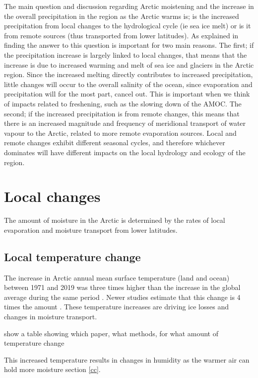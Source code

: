 \documentclass[11pt, oneside]{article}
\begin{document}
The main question and discussion regarding Arctic moistening and the increase in the overall precipitation in the region as the Arctic warms is; is the increased precipitation from local changes to the hydrological cycle (ie sea ice melt) or is it from remote sources (thus transported from lower latitudes). As explained in \cite{bintanja2014future} finding the answer to this question is important for two main reasons. The first; if the precipitation increase is largely linked to local changes, that means that the increase is due to increased warming and melt of sea ice and glaciers in the Arctic region. Since the increased melting directly contributes to increased precipitation, little changes will occur to the overall salinity of the ocean, since evaporation and precipitation will for the most part, cancel out. This is important when we think of impacts related to freshening, such as the slowing down of the AMOC. The second; if the increased precipitation is from remote changes, this means that there is an increased magnitude and frequency of meridional transport of water vapour to the Arctic, related to more remote evaporation sources. Local and remote changes exhibit different seasonal cycles, and therefore whichever dominates will have different impacts on the local hydrology and ecology of the region.


\section{Local changes}\label{local}
The amount of moisture in the Arctic is determined by the rates of local evaporation and moisture transport from lower latitudes.

\subsection{Local temperature change}\label{local_temp}
The increase in Arctic annual mean surface temperature (land and ocean) between 1971 and 2019 was three times higher than the increase in the global average during the same period \cite{AMAP}. Newer studies estimate that this change is 4 times the amount \cite{rantanen2022arctic}. These temperature increases are driving ice losses and changes in moisture transport.


show a table showing which paper, what methods, for what amount of temperature change


This increased temperature results in changes in humidity as the warmer air can hold more moisture section \ref{cc}. 
\end{document}
